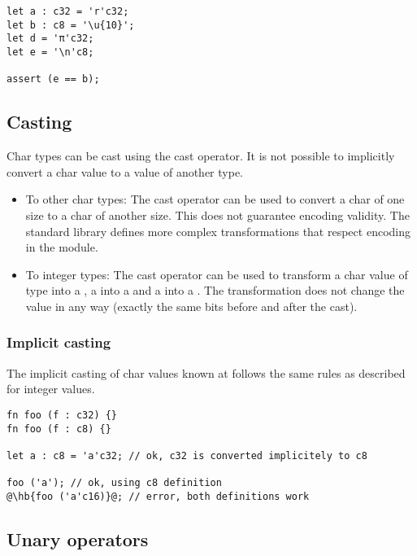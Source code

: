 \begin{lstlisting}[style=coloredverbatim]
let a : c32 = 'r'c32;
let b : c8 = '\u{10}';
let d = 'π'c32;
let e = '\n'c8;

assert (e == b);
\end{lstlisting}

\subsection{Casting}
\label{sec:org16d703f}

Char types can be cast using the cast operator. It is not possible to implicitly convert a char value to a value of another type.

\begin{itemize}
  \setlength\itemsep{-4pt}
\item To other char types: The cast operator can be used to convert a char of
  one size to a char of another size. This does not guarantee encoding validity.
  The standard library defines more complex transformations that respect
  encoding in the  module.

\item To integer types: The cast operator can be used to transform a char value
  of type  into a , a  into a  and
  a  into a . The transformation does not change the
  value in any way (exactly the same bits before and after the cast).

\end{itemize}


\subsubsection{Implicit casting}

The implicit casting of char values known at  follows the same
rules as described for integer  values.

\begin{lstlisting}[style=coloredverbatim, escapechar=@]
fn foo (f : c32) {}
fn foo (f : c8) {}

let a : c8 = 'a'c32; // ok, c32 is converted implicitely to c8

foo ('a'); // ok, using c8 definition
@\hb{foo ('a'c16)}@; // error, both definitions work
\end{lstlisting}

\subsection{Unary operators}
\label{sec:org78546fb}

